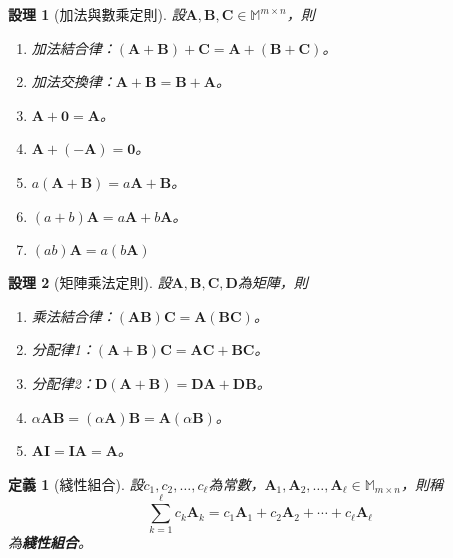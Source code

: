 \documentclass[12pt]{article}
\newtheorem{definition}{定義}
\newtheorem*{proposition}{設理}
\begin{document}
    \begin{proposition}[加法與數乘定則]
        設$\mathbf{A},\mathbf{B},\mathbf{C}\in\mathbb{M}^{m\times n}$，則\begin{enumerate}
            \item 加法結合律：$(\mathbf{A}+\mathbf{B})+\mathbf{C}=\mathbf{A}+(\mathbf{B}+\mathbf{C})$。
            \item 加法交換律：$\mathbf{A}+\mathbf{B}=\mathbf{B}+\mathbf{A}$。
            \item $\mathbf{A}+\mathbf{0}=\mathbf{A}$。
            \item $\mathbf{A}+(-\mathbf{A})=\mathbf{0}$。
            \item $a(\mathbf{A}+\mathbf{B})=a\mathbf{A}+\mathbf{B}$。
            \item $(a+b)\mathbf{A}=a\mathbf{A}+b\mathbf{A}$。
            \item $(ab)\mathbf{A}=a(b\mathbf{A})$
        \end{enumerate}
    \end{proposition}

    \begin{proposition}[矩陣乘法定則]
        設$\mathbf{A},\mathbf{B},\mathbf{C},\mathbf{D}$為矩陣，則\begin{enumerate}
            \item 乘法結合律：$(\mathbf{A}\mathbf{B})\mathbf{C}=\mathbf{A}(\mathbf{B}\mathbf{C})$。
            \item 分配律1：$(\mathbf{A}+\mathbf{B})\mathbf{C}=\mathbf{A}\mathbf{C}+\mathbf{B}\mathbf{C}$。
            \item 分配律2：$\mathbf{D}(\mathbf{A}+\mathbf{B})=\mathbf{D}\mathbf{A}+\mathbf{D}\mathbf{B}$。
            \item $\alpha\mathbf{A}\mathbf{B}=(\alpha\mathbf{A})\mathbf{B}=\mathbf{A}(\alpha\mathbf{B})$。
            \item $\mathbf{A}\mathbf{I}=\mathbf{I}\mathbf{A}=\mathbf{A}$。
        \end{enumerate}
    \end{proposition}
    
    \begin{definition}[綫性組合]
        設$c_1,c_2,\dots,c_\ell$為常數，$\mathbf{A}_1,\mathbf{A}_2,\dots,\mathbf{A}_\ell\in\mathbb{M}_{m\times n}$，則稱$$\sum_{k=1}^{\ell}c_k\mathbf{A}_k=c_1\mathbf{A}_1+c_2\mathbf{A}_2+\cdots+c_\ell\mathbf{A}_\ell$$為\textbf{綫性組合}。
    \end{definition}
\end{document}
